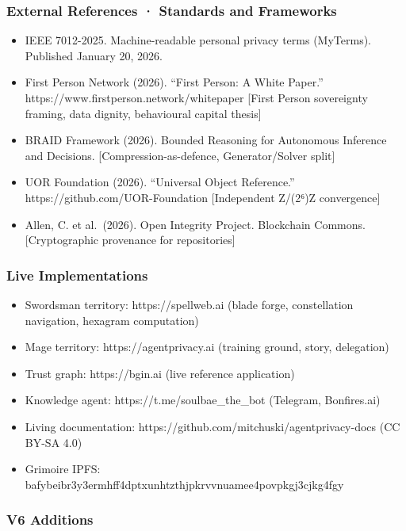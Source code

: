 \documentclass[
]{article}
\providecommand{\tightlist}{%
  \setlength{\itemsep}{0pt}\setlength{\parskip}{0pt}}
\begin{document}
\subsubsection{External References · Standards and
Frameworks}\label{external-references-standards-and-frameworks}

\begin{itemize}
\tightlist
\item
  IEEE 7012-2025. Machine-readable personal privacy terms (MyTerms).
  Published January 20, 2026.
\item
  First Person Network (2026). ``First Person: A White Paper.''
  https://www.firstperson.network/whitepaper {[}First Person sovereignty
  framing, data dignity, behavioural capital thesis{]}
\item
  BRAID Framework (2026). Bounded Reasoning for Autonomous Inference and
  Decisions. {[}Compression-as-defence, Generator/Solver split{]}
\item
  UOR Foundation (2026). ``Universal Object Reference.''
  https://github.com/UOR-Foundation {[}Independent Z/(2⁶)Z
  convergence{]}
\item
  Allen, C. et al.~(2026). Open Integrity Project. Blockchain Commons.
  {[}Cryptographic provenance for repositories{]}
\end{itemize}

\subsubsection{Live Implementations}\label{live-implementations}

\begin{itemize}
\tightlist
\item
  Swordsman territory: https://spellweb.ai (blade forge, constellation
  navigation, hexagram computation)
\item
  Mage territory: https://agentprivacy.ai (training ground, story,
  delegation)
\item
  Trust graph: https://bgin.ai (live reference application)
\item
  Knowledge agent: https://t.me/soulbae\_the\_bot (Telegram,
  Bonfires.ai)
\item
  Living documentation: https://github.com/mitchuski/agentprivacy-docs
  (CC BY-SA 4.0)
\item
  Grimoire IPFS:
  bafybeibr3y3ermhff4dptxunhtzthjpkrvvnuamee4povpkgj3cjkg4fgy
\end{itemize}

\subsubsection{V6 Additions}\label{v6-additions}
\end{document}
